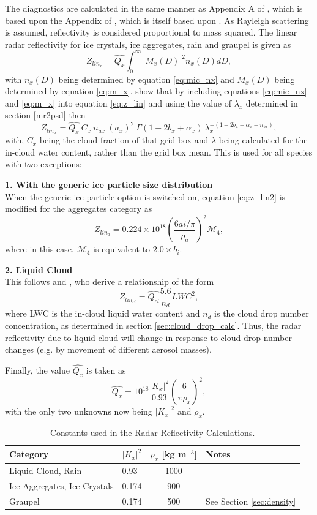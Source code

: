 \documentclass{UMDP_article}
\def\bq{\begin{equation}}
\def\eq{\end{equation}}
\begin{document}
The diagnostics are calculated in the same manner as Appendix A of \cite{Stein:etal:2014},
which is based upon the Appendix of \cite{McBeath:etal:2014}, which is itself based upon 
\cite{Gaussiat:2008}. As Rayleigh scattering is assumed, reflectivity is considered
proportional to mass squared. The linear radar reflectivity for ice crystals, 
ice aggregates, rain and graupel is given as
\bq
\label{eq:z_lin}
Z_{lin_x} = \hat{Q_x} \int_0^{\infty} |M_x(D)|^2 n_x(D) dD,
\eq
with $n_x(D)$ being determined by equation \ref{eq:mic_nx} and $M_x(D)$ being determined by
equation \ref{eq:m_x}. \cite{Stein:etal:2014} show that by including equations \ref{eq:mic_nx}
and \ref{eq:m_x} into equation \ref{eq:z_lin} and using the value of $\lambda_x$ determined in 
section \ref{mr2psd} then 
\bq
\label{eq:z_lin2}
Z_{lin_x} = \hat{Q_x}~ C_x~n_{ax}~(a_x)^2~ \Gamma(1+2b_x+\alpha_x)~ \lambda_x^{-(1+2b_x+\alpha_x-n_{bx})},
\eq
with, $C_x$ being the cloud fraction of that grid box and $\lambda$ being 
calculated for the in-cloud water content, rather than the grid box mean. 
This is used for all species with two exceptions:

\textbf{1. With the generic ice particle size distribution} \\
When the generic ice particle option is switched on, equation \ref{eq:z_lin2} 
is modified for the aggregates category as 
\bq
\label{eq:z_psd}
Z_{lin_a} = 0.224 \times 10^{18} \left(\frac{6 ai/\pi}{\rho_a}\right)^2 \mathcal{M}_4,
\eq
where in this case, $\mathcal{M}_4$ is equivalent to $2.0 \times b_i$.

\textbf{2. Liquid Cloud}\\
This follows \cite{Stein:etal:2014} and \cite{McBeath:etal:2014}, who derive a relationship of the form
\bq
\label{eq:z_liq}
Z_{lin_{cl}} = \hat{Q_{cl}} \frac{5.6}{n_d} LWC^2,
\eq  
where LWC is the in-cloud liquid water content and $n_d$ is the cloud drop 
number concentration, as determined in section \ref{sec:cloud_drop_calc}. 
Thus, the radar reflectivity due to liquid cloud will change in response to 
cloud drop number changes (e.g. by movement of different aerosol masses). 

Finally, the value $\hat{Q_x}$ is taken as 
\bq
\label{eq:qhat}
\hat{Q_x} = 10^{18} \frac{|K_x|^2}{0.93}\left(\frac{6}{\pi \rho_x}\right)^2,
\eq
with the only two unknowns now being $|K_x|^2$ and $\rho_x$. 
\begin{table}[h!]
\begin{center}
\begin{tabular}{|l|l|c|l|}
\hline
Category & $|K_x|^2$ & $\rho_x$ [kg m$^{-3}$] & Notes \\
\hline
Liquid Cloud, Rain & 0.93 & 1000 & \\
Ice Aggregates, Ice Crystals & 0.174 & 900 & \\
Graupel & 0.174 & 500 &  See Section \ref{sec:density}\\
\hline
\end{tabular}
\caption{\label{tab:rad_param} Constants used in the Radar Reflectivity Calculations. }
\end{center}
\end{table}
\end{document}
